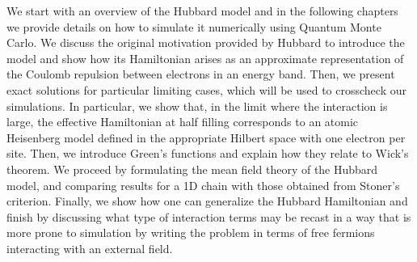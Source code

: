 \label{cap:hubbard}

\slshape

We start with an overview of the Hubbard model and in the following chapters we provide details on how to simulate it numerically using Quantum Monte Carlo. We discuss the original motivation provided by Hubbard to introduce the model and show how its Hamiltonian arises as an approximate representation of the Coulomb repulsion between electrons in an energy band. Then, we present exact solutions for particular limiting cases, which will be used to crosscheck our simulations. In particular, we show that, in the limit where the interaction is large, the effective Hamiltonian at half filling corresponds to an atomic Heisenberg model defined in the appropriate Hilbert space with one electron per site.
Then, we introduce Green's functions and explain how they relate to Wick's theorem. We proceed by formulating the mean field theory of the Hubbard model, and comparing results for a \acs{1D} chain with those obtained from Stoner's criterion.
Finally, we show how one can generalize the Hubbard Hamiltonian and finish by discussing what type of interaction terms may be recast in a way that is more prone to simulation by writing the problem in terms of free fermions interacting with an external field.

\normalfont









\cleardoublepage
